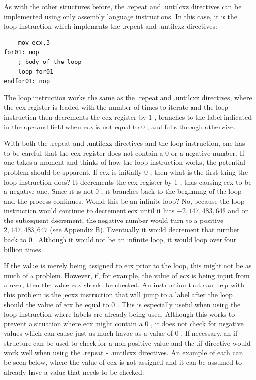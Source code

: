 \documentclass[10pt]{article}
\begin{document}
As with the other structures before, the .repeat and .untilcxz directives can be implemented using only assembly language instructions. In this case, it is the loop instruction which implements the .repeat and .untilcxz directives:

\begin{verbatim}
    mov ecx,3
for01: nop
    ; body of the loop
    loop for01
endfor01: nop
\end{verbatim}

The loop instruction works the same as the .repeat and .untilcxz directives, where the ecx register is loaded with the number of times to iterate and the loop instruction then decrements the ecx register by 1 , branches to the label indicated in the operand field when ecx is not equal to 0 , and falls through otherwise.

With both the .repeat and .untilcxz directives and the loop instruction, one has to be careful that the ecx register does not contain a 0 or a negative number. If one takes a moment and thinks of how the loop instruction works, the potential problem should be apparent. If ecx is initially 0 , then what is the first thing the loop instruction does? It decrements the ecx register by 1 , thus causing ecx to be a negative one. Since it is not 0 , it branches back to the beginning of the loop and the process continues. Would this be an infinite loop? No, because the loop instruction would continue to decrement ecx until it hits $-2,147,483,648$ and on the subsequent decrement, the negative number would turn to a positive $2,147,483,647$ (see Appendix B). Eventually it would decrement that number back to 0 . Although it would not be an infinite loop, it would loop over four billion times.

If the value is merely being assigned to ecx prior to the loop, this might not be as much of a problem. However, if, for example, the value of ecx is being input from a user, then the value ecx should be checked. An instruction that can help with this problem is the jecxz instruction that will jump to a label after the loop should the value of ecx be equal to 0 . This is especially useful when using the loop instruction where labels are already being used. Although this works to prevent a situation where ecx might contain a 0 , it does not check for negative values which can cause just as much havoc as a value of 0 . If necessary, an if structure can be used to check for a non-positive value and the .if directive would\\
work well when using the .repeat - .untilcxz directives. An example of each can be seen below, where the value of ecx is not assigned and it can be assumed to already have a value that needs to be checked:
\end{document}
